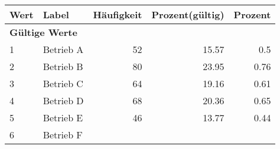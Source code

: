      \begin{longtable}{lXrrr}
     \toprule
     \textbf{Wert} & \textbf{Label} & \textbf{Häufigkeit} & \textbf{Prozent(gültig)} & \textbf{Prozent} \\
     \endhead
     \midrule
     \multicolumn{5}{l}{\textbf{Gültige Werte}}\\

     1 &
     \multicolumn{1}{X}{ Betrieb A   } &


       \num{52} &
       \num[round-mode=places,round-precision=2]{15,57} &
         \num[round-mode=places,round-precision=2]{0,5} \\

     2 &
     \multicolumn{1}{X}{ Betrieb B   } &


       \num{80} &
       \num[round-mode=places,round-precision=2]{23,95} &
         \num[round-mode=places,round-precision=2]{0,76} \\

     3 &
     \multicolumn{1}{X}{ Betrieb C   } &


       \num{64} &
       \num[round-mode=places,round-precision=2]{19,16} &
         \num[round-mode=places,round-precision=2]{0,61} \\

     4 &
     \multicolumn{1}{X}{ Betrieb D   } &


       \num{68} &
       \num[round-mode=places,round-precision=2]{20,36} &
         \num[round-mode=places,round-precision=2]{0,65} \\

     5 &
     \multicolumn{1}{X}{ Betrieb E   } &


       \num{46} &
       \num[round-mode=places,round-precision=2]{13,77} &
         \num[round-mode=places,round-precision=2]{0,44} \\

     6 &
     \multicolumn{1}{X}{ Betrieb F   } &



\end{longtable}
